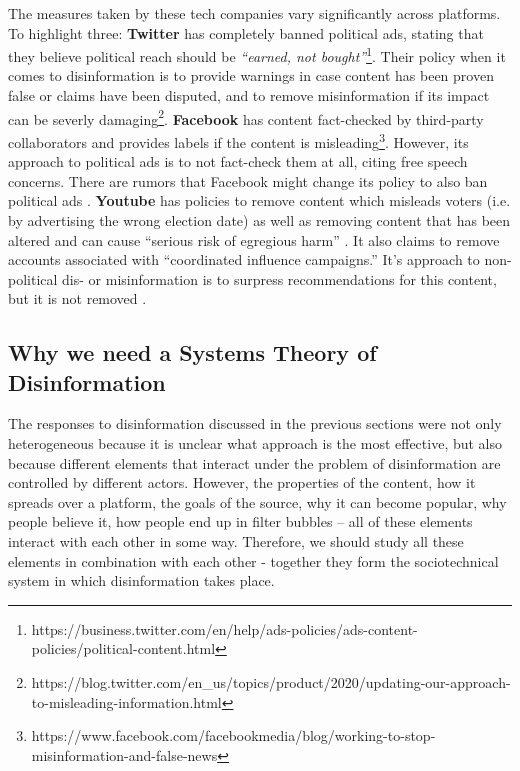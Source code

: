 \documentclass[10pt,a4paper]{article}
\begin{document}
 The measures taken by these tech companies vary significantly across platforms. To highlight three: \textbf{Twitter} has completely banned political ads, stating that they believe political reach should be \textit{``earned, not bought''}\footnote{https://business.twitter.com/en/help/ads-policies/ads-content-policies/political-content.html}. Their policy when it comes to disinformation is to provide warnings in case content has been proven false or claims have been disputed, and to remove misinformation if its impact can be severly damaging\footnote{https://blog.twitter.com/en\_us/topics/product/2020/updating-our-approach-to-misleading-information.html}. \textbf{Facebook} has content fact-checked by third-party collaborators and provides labels if the content is misleading\footnote{https://www.facebook.com/facebookmedia/blog/working-to-stop-misinformation-and-false-news}. However, its approach to political ads is to not fact-check them at all, citing free speech concerns. There are rumors that Facebook might change its policy to also ban political ads \citep{Isaac2020NYT}. \textbf{Youtube} has policies to remove content which misleads voters (i.e. by advertising the wrong election date) as well as removing content that has been altered and can cause ``serious risk of egregious harm'' \citep{Miller2020YT}. It also claims to remove accounts associated with ``coordinated influence campaigns.'' It's approach to non-political dis- or misinformation is to surpress recommendations for this content, but it is not removed \citep{YT2019recom}. 



\subsection{Why we need a Systems Theory of Disinformation} \label{systemsapproach}
The responses to disinformation discussed in the previous sections were not only heterogeneous because it is unclear what approach is the most effective, but also because different elements that interact under the problem of disinformation are controlled by different actors. However, the properties of the content, how it spreads over a platform, the goals of the source, why it can become popular, why people believe it, how people end up in filter bubbles – all of these elements interact with each other in some way. Therefore, we should study all these elements in combination with each other - together they form the sociotechnical system in which disinformation takes place. \\
\end{document}
